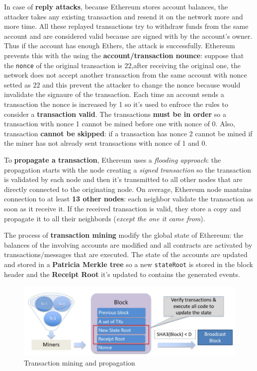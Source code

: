 \documentclass[10pt,a4paper]{report}
\begin{document}
In case of \textbf{reply attacks}, because Ethereum stores account balances, the attacker takes any existing transaction and resend it on the network more and more time. All these replayed transactions try to withdraw funds from the same account and are considered valid because are signed with by the account's owner. Thus if the account has enough Ethers, the attack is successfully.
Ethereum prevents this with the using the \textbf{account/transaction nounce}: suppose that the \texttt{nonce} of the original transaction is $22$,after receiving the original one, the network does not accept another transaction from the same account with nonce setted as $22$ and this prevent the attacker to change the nonce because would invalidate the signaure of the transaction.
Each time an account sends a transaction the nonce is increased by 1 so it's used to enfroce the rules to consider a \textbf{transaction valid}.
The transactions \textbf{must be in order} so a transaction with nonce 1 cannot be mined before one with nonce of 0. Also, transaction \textbf{cannot be skipped}: if a transaction has nonce 2 cannot be mined if the miner has not already sent transactions with nonce of 1 and 0.

To \textbf{propagate a transaction}, Ethereum uses a \textit{flooding approach}: the propagation starts with the node creating a \textit{signed transaction} so the transaction is validated by each node and then it's transmitted to all other nodes that are directly connected to the originating node. On average, Ethereum node mantains connection to at least \textbf{13 other nodes}: each neighbor validate the transaction as soon as it receive it. If the received transaction is valid, they store a copy and propagate it to all their neighbords (\textit{except the one it came from}).

The process of \textbf{transaction mining} modify the global state of Ethereum: the balances of the involving accounts are modified and all contracts are activated by transactions/messages that are executed. The state of the accounts are updated and stored in a \textbf{Patricia Merkle tree} so a new  \texttt{stateRoot} is stored in the block header and the \textbf{Receipt Root} it's updated to contains the generated events.
\begin{figure}[h]
	\centering
	\includegraphics[scale=0.50]{images/Pasted image 20230417122024.png}
	\caption{Transaction mining and propagation}
\end{figure}
\end{document}
